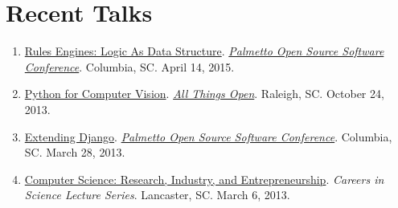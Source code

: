 \documentclass[10pt]{article}
\begin{document}
\section{Recent Talks}
{\footnotesize
\begin{enumerate}[align=left,labelsep=0em]
\renewcommand{\labelenumi}{[\arabic{enumi}]}
\item \href{http://www.malloc47.com/posscon2015/}{Rules Engines: Logic As Data Structure}. \emph{\href{http://posscon.org/}{Palmetto Open Source Software Conference}}. Columbia, SC. April 14, 2015.
\item \href{http://www.malloc47.com/ato2013/}{Python for Computer Vision}. \emph{\href{http://allthingsopen.org/}{All Things Open}}. Raleigh, SC. October 24, 2013.
\item \href{http://www.malloc47.com/posscon2013/}{Extending Django}. \emph{\href{http://posscon.org/}{Palmetto Open Source Software Conference}}.  Columbia, SC.  March 28, 2013.
\item \href{http://www.malloc47.com/cs-careers/}{Computer Science: Research, Industry, and Entrepreneurship}.  \emph{Careers in Science Lecture Series}.  Lancaster, SC.  March 6, 2013.
\end{enumerate} }
\end{document}
